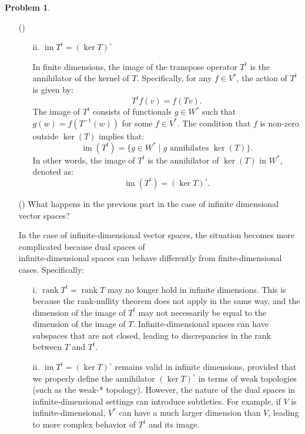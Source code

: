\documentclass[12pt]{article}
\theoremstyle{definition}
\newtheorem{problem}{Problem}
\newcounter{subq}[problem]
\newenvironment{subproblem}
{\refstepcounter{subq} \begin{itemize} \item[(\alph{subq})]}
{\end{itemize} \medskip}
\DeclareMathOperator{\ima}{im}
\DeclareMathOperator{\rank}{rank}
\begin{document}
\begin{problem}
\begin{subproblem}
\begin{enumerate}
            \item[ii.] $\ima T^t = (\ker T)^\circ$\\
            \begin{solution}
                In finite dimensions, the image of the transpose operator $T^t$ is the annihilator of the kernel of $T$. Specifically, for any $f \in V^*$, the action of $T^t$ is given by:
                \[
                T^t f (v) = f(Tv).
                \]
                The image of $T^t$ consists of functionals $g \in W^*$ such that $g(w) = f(T^{-1}(w))$ for some $f \in V^*$. The condition that $f$ is non-zero outside $\ker(T)$ implies that:
                \[
                \ima(T^t) = \{ g \in W^* \mid g \text{ annihilates } \ker(T) \}.
                \]
                In other words, the image of $T^t$ is the annihilator of $\ker(T)$ in $W^*$, denoted as:
                \[
                \ima(T^t) = (\ker T)^\circ.
                \]
            \end{solution}
        \end{enumerate}
    \end{subproblem}

    \begin{subproblem}
        What happens in the previous part in the case of infinite dimensional vector spaces?

        \begin{solution}
            In the case of infinite-dimensional vector spaces, the situation becomes more complicated because dual spaces of \\infinite-dimensional spaces can behave differently from finite-dimensional cases. Specifically:
            
            \begin{enumerate}
                \item[i.] $\rank T^t = \rank T$ may no longer hold in infinite dimensions. This is because the rank-nullity theorem does not apply in the same way, and the dimension of the image of $T^t$ may not necessarily be equal to the dimension of the image of $T$. Infinite-dimensional spaces can have subspaces that are not closed, leading to discrepancies in the rank between $T$ and $T^t$.

                \item[ii.] $\ima T^t = (\ker T)^\circ$ remains valid in infinite dimensions, provided that we properly define the annihilator $(\ker T)^\circ$ in terms of weak topologies (such as the weak-* topology). However, the nature of the dual spaces in infinite-dimensional settings can introduce subtleties. For example, if $V$ is infinite-dimensional, $V^*$ can have a much larger dimension than $V$, leading to more complex behavior of $T^t$ and its image.
            \end{enumerate}


\end{solution}
\end{subproblem}
\end{problem}
\end{document}
